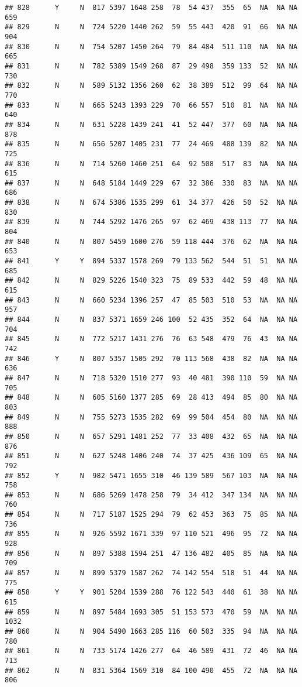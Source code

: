 \documentclass[]{article}
\begin{document}
\begin{verbatim}
## 828      Y     N  817 5397 1648 258  78  54 437  355  65  NA  NA NA  659
## 829      N     N  724 5220 1440 262  59  55 443  420  91  66  NA NA  904
## 830      N     N  754 5207 1450 264  79  84 484  511 110  NA  NA NA  665
## 831      N     N  782 5389 1549 268  87  29 498  359 133  52  NA NA  730
## 832      N     N  589 5132 1356 260  62  38 389  512  99  64  NA NA  770
## 833      N     N  665 5243 1393 229  70  66 557  510  81  NA  NA NA  640
## 834      N     N  631 5228 1439 241  41  52 447  377  60  NA  NA NA  878
## 835      N     N  656 5207 1405 231  77  24 469  488 139  82  NA NA  725
## 836      N     N  714 5260 1460 251  64  92 508  517  83  NA  NA NA  615
## 837      N     N  648 5184 1449 229  67  32 386  330  83  NA  NA NA  686
## 838      N     N  674 5386 1535 299  61  34 377  426  50  52  NA NA  830
## 839      N     N  744 5292 1476 265  97  62 469  438 113  77  NA NA  804
## 840      N     N  807 5459 1600 276  59 118 444  376  62  NA  NA NA  653
## 841      Y     Y  894 5337 1578 269  79 133 562  544  51  51  NA NA  685
## 842      N     N  829 5226 1540 323  75  89 533  442  59  48  NA NA  615
## 843      N     N  660 5234 1396 257  47  85 503  510  53  NA  NA NA  957
## 844      N     N  837 5371 1659 246 100  52 435  352  64  NA  NA NA  704
## 845      N     N  772 5217 1431 276  76  63 548  479  76  43  NA NA  742
## 846      Y     N  807 5357 1505 292  70 113 568  438  82  NA  NA NA  636
## 847      N     N  718 5320 1510 277  93  40 481  390 110  59  NA NA  705
## 848      N     N  605 5160 1377 285  69  28 413  494  85  80  NA NA  803
## 849      N     N  755 5273 1535 282  69  99 504  454  80  NA  NA NA  888
## 850      N     N  657 5291 1481 252  77  33 408  432  65  NA  NA NA  876
## 851      N     N  627 5248 1406 240  74  37 425  436 109  65  NA NA  792
## 852      Y     N  982 5471 1655 310  46 139 589  567 103  NA  NA NA  758
## 853      N     N  686 5269 1478 258  79  34 412  347 134  NA  NA NA  760
## 854      N     N  717 5187 1525 294  79  62 453  363  75  85  NA NA  736
## 855      N     N  926 5592 1671 339  97 110 521  496  95  72  NA NA  928
## 856      N     N  897 5388 1594 251  47 136 482  405  85  NA  NA NA  709
## 857      N     N  899 5379 1587 262  74 142 554  518  51  44  NA NA  775
## 858      Y     Y  901 5204 1539 288  76 122 543  440  61  38  NA NA  615
## 859      N     N  897 5484 1693 305  51 153 573  470  59  NA  NA NA 1032
## 860      N     N  904 5490 1663 285 116  60 503  335  94  NA  NA NA  780
## 861      N     N  733 5174 1426 277  64  46 589  431  72  46  NA NA  713
## 862      N     N  831 5364 1569 310  84 100 490  455  72  NA  NA NA  806

\end{verbatim}
\end{document}
